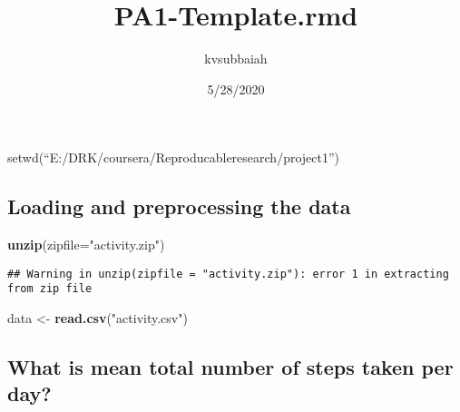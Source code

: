 \documentclass[
]{article}
\title{PA1-Template.rmd}
\author{kvsubbaiah}
\date{5/28/2020}
\newenvironment{Shaded}{\begin{snugshade}}{\end{snugshade}}
\newcommand{\DataTypeTok}[1]{\textcolor[rgb]{0.13,0.29,0.53}{#1}}
\newcommand{\DecValTok}[1]{\textcolor[rgb]{0.00,0.00,0.81}{#1}}
\newcommand{\KeywordTok}[1]{\textcolor[rgb]{0.13,0.29,0.53}{\textbf{#1}}}
\newcommand{\NormalTok}[1]{#1}
\newcommand{\OperatorTok}[1]{\textcolor[rgb]{0.81,0.36,0.00}{\textbf{#1}}}
\newcommand{\OtherTok}[1]{\textcolor[rgb]{0.56,0.35,0.01}{#1}}
\newcommand{\StringTok}[1]{\textcolor[rgb]{0.31,0.60,0.02}{#1}}
\begin{document}
\maketitle

setwd(``E:/DRK/coursera/Reproducableresearch/project1'')

\hypertarget{loading-and-preprocessing-the-data}{%
\subsection{Loading and preprocessing the
data}\label{loading-and-preprocessing-the-data}}

\begin{Shaded}
\begin{Highlighting}[]
\KeywordTok{unzip}\NormalTok{(}\DataTypeTok{zipfile=}\StringTok{"activity.zip"}\NormalTok{)}
\end{Highlighting}
\end{Shaded}

\begin{verbatim}
## Warning in unzip(zipfile = "activity.zip"): error 1 in extracting from zip file
\end{verbatim}

\begin{Shaded}
\begin{Highlighting}[]
\NormalTok{data <-}\StringTok{ }\KeywordTok{read.csv}\NormalTok{(}\StringTok{"activity.csv"}\NormalTok{)}
\end{Highlighting}
\end{Shaded}

\hypertarget{what-is-mean-total-number-of-steps-taken-per-day}{%
\subsection{What is mean total number of steps taken per
day?}\label{what-is-mean-total-number-of-steps-taken-per-day}}

\begin{Shaded}
\end{Shaded}
\end{document}
